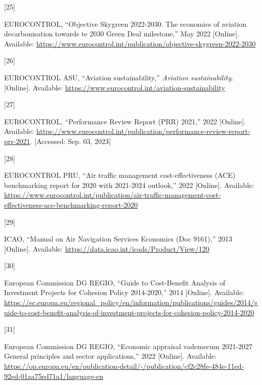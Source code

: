 \documentclass[
  11pt,
  a4paper,
]{book}
\newlength{\cslhangindent}
\newlength{\csllabelwidth}
\newlength{\cslentryspacingunit} %
\newenvironment{CSLReferences}[2] %
 {%
  \setlength{\parindent}{0pt}
  \ifodd #1
  \let\oldpar\par
  \def\par{\hangindent=\cslhangindent\oldpar}
  \fi
  \setlength{\parskip}{#2\cslentryspacingunit}
 }%
 {}
\newcommand{\CSLLeftMargin}[1]{\parbox[t]{\csllabelwidth}{#1}}
\newcommand{\CSLRightInline}[1]{\parbox[t]{\linewidth - \csllabelwidth}{#1}\break}
\begin{document}
\begin{CSLReferences}{0}{0}
\leavevmode{}%
\CSLLeftMargin{{[}25{]} }%
\CSLRightInline{EUROCONTROL, {``Objective {Skygreen} 2022-2030. {The}
economics of aviation decarbonisation towards te 2030 {Green Deal}
milestone,''} May 2022 {[}Online{]}. Available:
\url{https://www.eurocontrol.int/publication/objective-skygreen-2022-2030}}

\leavevmode{}%
\CSLLeftMargin{{[}26{]} }%
\CSLRightInline{EUROCONTROL ASU, {``Aviation sustainability,''}
\emph{Aviation sustainability}. {[}Online{]}. Available:
\url{https://www.eurocontrol.int/aviation-sustainability}}

\leavevmode{}%
\CSLLeftMargin{{[}27{]} }%
\CSLRightInline{EUROCONTROL, {``Performance {Review Report} ({PRR})
2021,''} 2022 {[}Online{]}. Available:
\url{https://www.eurocontrol.int/publication/performance-review-report-prr-2021}.
{[}Accessed: Sep. 03, 2023{]}}

\leavevmode{}%
\CSLLeftMargin{{[}28{]} }%
\CSLRightInline{EUROCONTROL PRU, {``Air traffic management
cost-effectiveness ({ACE}) benchmarking report for 2020 with 2021-2024
outlook,''} 2022 {[}Online{]}. Available:
\url{https://www.eurocontrol.int/publication/air-traffic-management-cost-effectiveness-ace-benchmarking-report-2020}}

\leavevmode{}%
\CSLLeftMargin{{[}29{]} }%
\CSLRightInline{ICAO, {``Manual on {Air Navigation Services Economics}
({Doc} 9161),''} 2013 {[}Online{]}. Available:
\url{https://data.icao.int/icads/Product/View/120}}

\leavevmode{}%
\CSLLeftMargin{{[}30{]} }%
\CSLRightInline{European Commission DG REGIO, {``Guide to {Cost-Benefit
Analysis} of {Investment Projects} for {Cohesion Policy} 2014-2020,''}
2014 {[}Online{]}. Available:
\url{https://ec.europa.eu/regional_policy/en/information/publications/guides/2014/guide-to-cost-benefit-analysis-of-investment-projects-for-cohesion-policy-2014-2020}}

\leavevmode{}%
\CSLLeftMargin{{[}31{]} }%
\CSLRightInline{European Commission DG REGIO, {``Economic appraisal
vademecum 2021-2027 {General} principles and sector applications,''}
2022 {[}Online{]}. Available:
\url{https://op.europa.eu/en/publication-detail/-/publication/cf2c28fe-484e-11ed-92ed-01aa75ed71a1/language-en}}


\end{CSLReferences}
\end{document}
